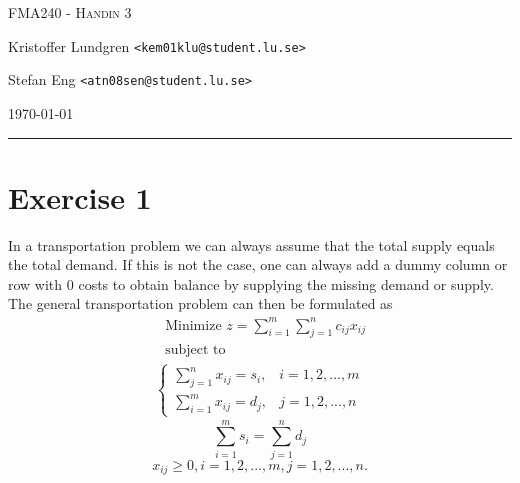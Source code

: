 \documentclass{article}
\begin{document}


\begin{centering}
	{\scshape\Large FMA240 - Handin 3\par}
	\vspace{0.5cm}
	Kristoffer Lundgren \texttt{<kem01klu@student.lu.se>}\par
	Stefan Eng \texttt{<atn08sen@student.lu.se>}\par
    \vspace{0.5cm}
	\today\par
    \rule{\textwidth}{0.4pt}
\end{centering}

\section*{Exercise 1}
  In a transportation problem we can always assume that the total supply equals
  the total demand. If this is not the case, one can always add a dummy column
  or row with 0 costs to obtain balance by supplying the missing demand or
  supply. The general transportation problem can then be formulated as
  \begin{align*}
  & \text{Minimize } z = \sum_{i=1}^{m}\sum_{j=1}^n c_{ij}x_{ij} \\
  & \text{subject to}
    \label{eq1}
  \end{align*}
  \begin{align}
    \begin{cases}
      \sum_{j=1}^{n} x_{ij} = s_{i}, & i = 1, 2, ..., m \\
      \sum_{i=1}^{m} x_{ij} = d_{j}, & j = 1, 2, ..., n
    \end{cases}
  \end{align}
  \begin{equation}
    \sum_{i=1}^{m} s_{i} = \sum_{j=1}^n d_{j}
    \label{eq3}
  \end{equation}
  \begin{equation}
    x_{ij} \geq 0, i = 1, 2, ..., m, j = 1, 2, ..., n.
    \label{eq4}
  \end{equation}
\end{document}
